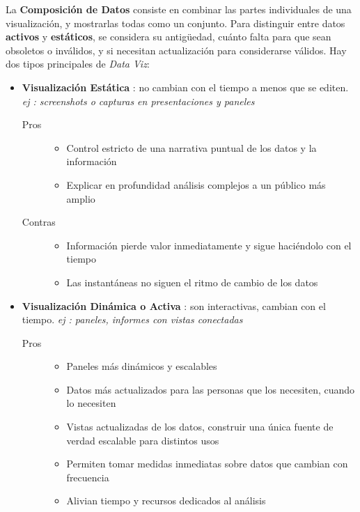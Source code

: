 La \textbf{Composición de Datos} consiste en combinar las partes individuales de una visualización, y mostrarlas todas como un conjunto. Para distinguir entre datos \textbf{activos} y \textbf{estáticos}, se considera su antigüedad, cuánto falta para que sean obsoletos o inválidos, y si necesitan actualización para considerarse válidos. Hay dos tipos principales de \textit{Data Viz}:
\begin{itemize}
    \item {\textbf{Visualización Estática} : no cambian con el tiempo a menos que se editen. \textit{ej : screenshots o capturas en presentaciones y paneles}
    \begin{description}
        \item [Pros]{ 
        \begin{itemize}
            \item {Control estricto de una narrativa puntual de los datos y la información}
            \item {Explicar en profundidad análisis complejos a un público más amplio}
        \end{itemize}}
        \item [Contras]{ 
        \begin{itemize}
            \item {Información pierde valor inmediatamente y sigue haciéndolo con el tiempo}
            \item {Las instantáneas no siguen el ritmo de cambio de los datos}
        \end{itemize}}
    \end{description}}
    \item {\textbf{Visualización Dinámica o Activa} : son interactivas, cambian con el tiempo. \textit{ej : paneles, informes con vistas conectadas}
    \begin{description}
        \item[Pros]{
        \begin{itemize}
            \item {Paneles más dinámicos y escalables}
            \item {Datos más actualizados para las personas que los necesiten, cuando lo necesiten}
            \item {Vistas actualizadas de los datos, construir una única fuente de verdad escalable para distintos usos}
            \item {Permiten tomar medidas inmediatas sobre datos que cambian con frecuencia}
            \item {Alivian tiempo y recursos dedicados al análisis}

\end{itemize}}
\end{description}}
\end{itemize}
